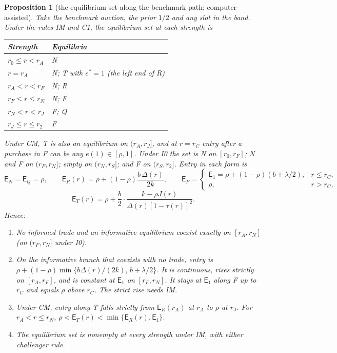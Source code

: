 \documentclass[11pt]{article}
\newtheorem{proposition}{Proposition}
\theoremstyle{definition}
\newcommand{\Ent}{\mathsf E}
\begin{document}
\setcounter{proposition}{2}
\begin{proposition}[the equilibrium set along the benchmark path; computer-assisted]\label{prop:3}
Take the benchmark auction, the prior $1/2$ and any slot in the band. Under the rules IM and C1, the equilibrium
set at each strength is
\begin{center}
\begin{tabular}{@{}ll@{}}
\toprule
Strength & Equilibria\\
\midrule
$r_0\le r<r_A$ & N\\
$r=r_A$ & N; T with $e^*=1$ (the left end of R)\\
$r_A<r<r_F$ & N; R\\
$r_F\le r\le r_N$ & N; F\\
$r_N<r<r_J$ & F; Q\\
$r_J\le r\le r_2$ & F\\
\bottomrule
\end{tabular}
\end{center}
Under CM, T is also an equilibrium on $(r_A,r_J]$, and at $r=r_C$ entry after a purchase in F can be any
$e(1)\in[\rho,1]$. Under I0 the set is N on $[r_0,r_F]$; N and F on $(r_F,r_N]$; empty on $(r_N,r_S]$; and F on
$(r_S,r_2]$. Entry in each form is
\[
\Ent_N=\Ent_Q=\rho,\qquad \Ent_R(r)=\rho+(1-\rho)\frac{b\,\Delta(r)}{2k},\qquad
\Ent_F=\begin{cases}\Ent_1=\rho+(1-\rho)(b+\lambda/2), & r\le r_C,\\ \rho, & r>r_C,\end{cases}
\]
\[
\Ent_T(r)=\rho+\frac b2\cdot\frac{k-\rho J(r)}{\Delta(r)[1-\tau(r)]^2}.
\]
Hence:
\begin{enumerate}[label=(\alph*)]
\item No informed trade and an informative equilibrium coexist exactly on $[r_A,r_N]$ (on $(r_F,r_N]$ under I0).
\item On the informative branch that coexists with no trade, entry is $\rho+(1-\rho)\min\{b\Delta(r)/(2k),\,b+\lambda/2\}$.
  It is continuous, rises strictly on $[r_A,r_F]$, and is constant at $\Ent_1$ on $[r_F,r_N]$. It stays at
  $\Ent_1$ along F up to $r_C$ and equals $\rho$ above $r_C$. The strict rise needs IM.
\item Under CM, entry along T falls strictly from $\Ent_R(r_A)$ at $r_A$ to $\rho$ at $r_J$. For
  $r_A<r\le r_N$, $\rho<\Ent_T(r)<\min\{\Ent_R(r),\Ent_1\}$.
\item The equilibrium set is nonempty at every strength under IM, with either challenger rule.
\end{enumerate}
\end{proposition}
\end{document}
